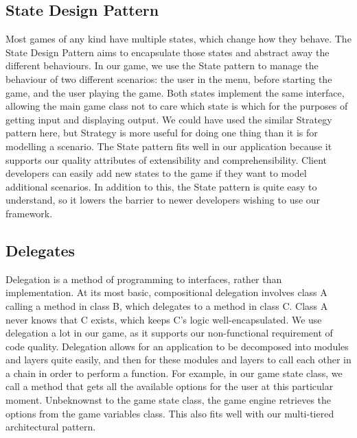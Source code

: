 \documentclass[11pt]{report}
\begin{document}
	\subsection{State Design Pattern}
	Most games of any kind have multiple states, which change how they behave. The State Design Pattern aims to encapsulate those states and abstract away the different behaviours. In our game, we use the State pattern to manage the behaviour of two different scenarios: the user in the menu, before starting the game, and the user playing the game. Both states implement the same interface, allowing the main game class not to care which state is which for the purposes of getting input and displaying output. We could have used the similar Strategy pattern here, but Strategy is more useful for doing one thing than it is for modelling a scenario. The State pattern fits well in our application because it supports our quality attributes of extensibility and comprehensibility. Client developers can easily add new states to the game if they want to model additional scenarios. In addition to this, the State pattern is quite easy to understand, so it lowers the barrier to newer developers wishing to use our framework.
	
	\subsection{Delegates}
	Delegation is a method of programming to interfaces, rather than implementation. At its most basic, compositional delegation involves class A calling a method in class B, which delegates to a method in class C. Class A never knows that C exists, which keeps C's logic well-encapsulated. We use delegation a lot in our game, as it supports our non-functional requirement of code quality. Delegation allows for an application to be decomposed into modules and layers quite easily, and then for these modules and layers to call each other in a chain in order to perform a function. For example, in our game state class, we call a method that gets all the available options for the user at this particular moment. Unbeknownst to the game state class, the game engine retrieves the options from the game variables class. This also fits well with our multi-tiered architectural pattern. 
	
\end{document}
